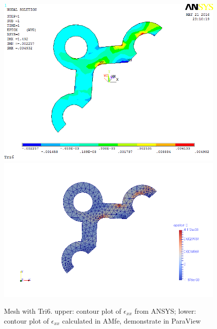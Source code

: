 \begin{figure}[htbp]
	\begin{center}
		\includegraphics[width=13cm,clip]{Tri6_Exx.png} 		
		\includegraphics[width=13cm,clip]{Tri6_Exx_P.png} 		
		\caption{Mesh with Tri6. upper: contour plot of $\epsilon_{xx}$ from ANSYS; lower: contour plot of $\epsilon_{xx}$ calculated in AMfe, demonstrate in ParaView} \label{fig: Tri6_Exx}
	\end{center}
\end{figure}
\clearpage 

